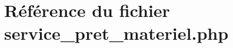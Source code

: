 \hypertarget{service__pret__materiel_8php}{
\section{R\'{e}f\'{e}rence du fichier service\_\-pret\_\-materiel.php}
\label{service__pret__materiel_8php}
}
